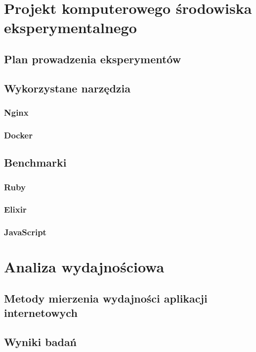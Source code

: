 \documentclass[mgr,oneside]{mgr}
\begin{document}
\chapter{Projekt komputerowego środowiska eksperymentalnego}
\section{Plan prowadzenia eksperymentów}

\section{Wykorzystane narzędzia}
\subsection{Nginx}
\subsection{Docker}
\section{Benchmarki}
\subsection{Ruby}
\subsection{Elixir}
\subsection{JavaScript}

\chapter{Analiza wydajnościowa}
\label{cha:analiza_wydajnosciowa}
\section{Metody mierzenia wydajności aplikacji internetowych}
\section{Wyniki badań}
\end{document}
